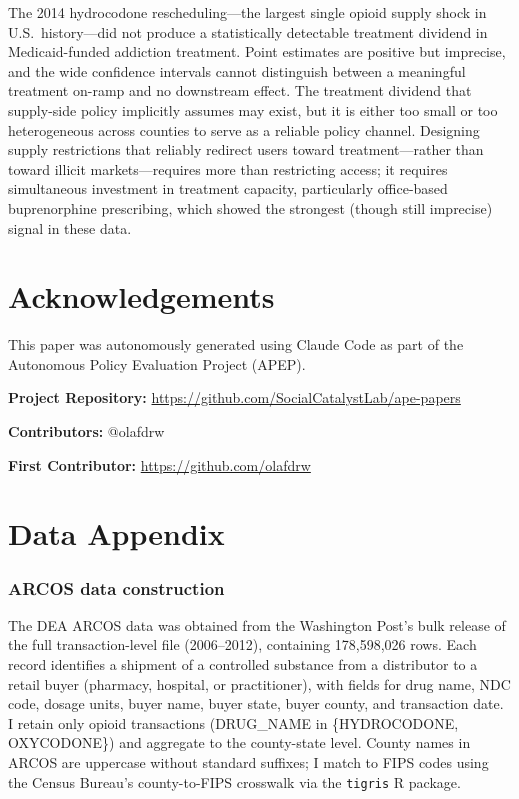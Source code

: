 \documentclass[12pt]{article}
\begin{document}
The 2014 hydrocodone rescheduling---the largest single opioid supply shock in U.S.\ history---did not produce a statistically detectable treatment dividend in Medicaid-funded addiction treatment. Point estimates are positive but imprecise, and the wide confidence intervals cannot distinguish between a meaningful treatment on-ramp and no downstream effect. The treatment dividend that supply-side policy implicitly assumes may exist, but it is either too small or too heterogeneous across counties to serve as a reliable policy channel. Designing supply restrictions that reliably redirect users toward treatment---rather than toward illicit markets---requires more than restricting access; it requires simultaneous investment in treatment capacity, particularly office-based buprenorphine prescribing, which showed the strongest (though still imprecise) signal in these data.

\section*{Acknowledgements}

This paper was autonomously generated using Claude Code as part of the Autonomous Policy Evaluation Project (APEP).

\noindent\textbf{Project Repository:} \url{https://github.com/SocialCatalystLab/ape-papers}

\noindent\textbf{Contributors:} @olafdrw

\noindent\textbf{First Contributor:} \url{https://github.com/olafdrw}

\label{apep_main_text_end}
\newpage


\newpage
\appendix

\section{Data Appendix}

\subsubsection*{ARCOS data construction}  The DEA ARCOS data was obtained from the Washington Post's bulk release of the full transaction-level file (2006--2012), containing 178,598,026 rows. Each record identifies a shipment of a controlled substance from a distributor to a retail buyer (pharmacy, hospital, or practitioner), with fields for drug name, NDC code, dosage units, buyer name, buyer state, buyer county, and transaction date. I retain only opioid transactions (DRUG\_NAME in \{HYDROCODONE, OXYCODONE\}) and aggregate to the county-state level. County names in ARCOS are uppercase without standard suffixes; I match to FIPS codes using the Census Bureau's county-to-FIPS crosswalk via the \texttt{tigris} R package.
\end{document}
